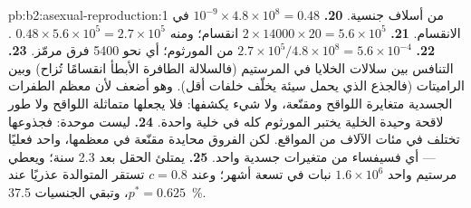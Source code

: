 \begin{solution}{pb:b2:asexual-reproduction:1}
من أسلاف جنسية.
\textbf{20.} $10^{-9}\times 4.8\times 10^{8} = 0.48$ في الانقسام.
\textbf{21.} $2\times \num{14000}\times 20 = 5.6\times 10^{5}$
انقسام؛ ومنه $0.48\times 5.6\times 10^{5} = 2.7\times 10^{5}$
.
\textbf{22.} $2.7\times 10^{5}/4.8\times 10^{8} = 5.6\times 10^{-4}$ من
المورثوم؛ أي نحو \num{5400} فرق مرمّز.
\textbf{23.} التنافس بين سلالات الخلايا في المرستيم (فالسلالة
الطافرة الأبطأ انقسامًا تُزاح) وبين الراميتات (فالجذع الذي
يحمل  سيئة يخلّف خلفات أقل). وهو أضعف لأن معظم الطفرات
الجسدية متغايرة اللواقح ومقنّعة، ولا شيء يكشفها:
فلا  يجعلها متماثلة اللواقح ولا طور لاقحة وحيدة
الخلية يختبر المورثوم كله في خلية واحدة.
\textbf{24.} ليست موحدة: فجذوعها تختلف في مئات الآلاف
من المواقع. لكن الفروق محايدة مقنّعة في معظمها، 
 واحد فعليًا --- أي فسيفساء من متغيرات جسدية
 واحد.
\textbf{25.} يمتلئ الحقل بعد 2.3 سنة؛ ويعطي مرستيم واحد
$1.6\times 10^{6}$ نبات في تسعة أشهر؛ وعند $c = 0.8$ تستقر المتوالدة
عذريًا عند $p^* = 0.625$، وتبقي الجنسيات \qty{37.5}{\%}.
\end{solution}
